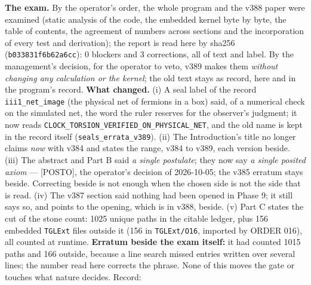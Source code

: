 \documentclass[11pt]{article}
\theoremstyle{definition}\newtheorem{deriv}{Derivation}
\begin{document}
\textbf{The exam.} By the operator's order, the whole program and the v388 paper were examined (static analysis of the code, the embedded kernel byte by byte, the table of contents, the agreement of numbers across sections and the incorporation of every test and derivation); the report is read here by sha256 (\texttt{b033831f6b62a6cc}): 0 blockers and 3 corrections, all of text and label. By the management's decision, for the operator to veto, v389 makes them \emph{without changing any calculation or the kernel}; the old text stays as record, here and in the program's record. \textbf{What changed.} (i) A seal label of the record \texttt{iii1\_net\_image} (the physical net of fermions in a box) said, of a numerical check on the simulated net, the word the ruler reserves for the observer's judgment; it now reads \texttt{CLOCK\_\allowbreak{}TORSION\_\allowbreak{}VERIFIED\_\allowbreak{}ON\_\allowbreak{}PHYSICAL\_\allowbreak{}NET}, and the old name is kept in the record itself (\texttt{seals\_errata\_v389}). (ii) The Introduction's title no longer claims \emph{now} with v384 and states the range, v384 to v389, each version beside. (iii) The abstract and Part B said \emph{a single postulate}; they now say \emph{a single posited axiom} --- \textsf{[POSTO]}, the operator's decision of 2026-10-05; the v385 erratum stays beside. Correcting beside is not enough when the chosen side is not the side that is read. (iv) The v387 section said nothing had been opened in Phase 9; it still says so, and points to the opening, which is in v388, beside. (v) Part C states the cut of the stone count: 1025 unique paths in the citable ledger, plus 156 embedded \texttt{TGLExt} files outside it (156 in \texttt{TGLExt/O16}, imported by ORDER 016), all counted at runtime. \textbf{Erratum beside the exam itself:} it had counted 1015 paths and 166 outside, because a line search missed entries written over several lines; the number read here corrects the phrase. None of this moves the gate or touches what nature decides. Record: 
\end{document}
